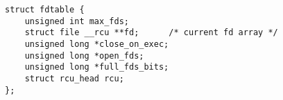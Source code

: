 
\begin{lstlisting}
struct fdtable {
	unsigned int max_fds;
	struct file __rcu **fd;      /* current fd array */
	unsigned long *close_on_exec;
	unsigned long *open_fds;
	unsigned long *full_fds_bits;
	struct rcu_head rcu;
};
\end{lstlisting}
